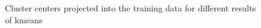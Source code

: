 \documentclass{article}
\begin{document}
\begin{figure}
  \centering
  \caption{Cluster centers projected into the training data for different results of kmeans}
  \label{fig:7meansclusters}
\end{figure}
\end{document}
